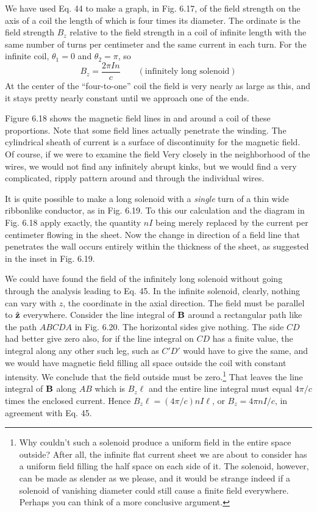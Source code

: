 We have used Eq. 44 to make a graph, in Fig. 6.17, of the field
strength on the axis of a coil the length of which is four times its
diameter. The ordinate is the field strength $B_z$ relative to the field
strength in a coil of infinite length with the same number of turns
per centimeter and the same current in each turn. For the infinite
coil, $\theta_1 = 0$ and $\theta_2 = \pi$, so
\begin{equation}
  B_z = \frac{2\pi I n}{c} \qquad (\text{infinitely long solenoid})
\end{equation}
At the center of the ``four-to-one'' coil the field is very nearly as large
as this, and it stays pretty nearly constant until we approach one of
the ends.

Figure 6.18 shows the magnetic field lines in and around a coil of
these proportions. Note that some field lines actually penetrate the
winding. The cylindrical sheath of current is a surface of discontinuity
for the magnetic field. Of course, if we were to examine the
field Very closely in the neighborhood of the wires, we would not find
any infinitely abrupt kinks, but we would find a very complicated,
ripply pattern around and through the individual wires.

It is quite possible to make a long solenoid with a \emph{single} turn of a
thin wide ribbonlike conductor, as in Fig. 6.19. To this our calculation
and the diagram in Fig. 6.18 apply exactly, the quantity $nI$ being
merely replaced by the current per centimeter flowing in the sheet.
Now the change in direction of a field line that penetrates the wall
occurs entirely within the thickness of the sheet, as suggested in the
inset in Fig. 6.19.

We could have found the field of the infinitely long solenoid without
going through the analysis leading to Eq. 45. In the infinite
solenoid, clearly, nothing can vary with $z$, the coordinate in the axial
direction. The field must be parallel to $\hat{\mathbf{z}}$ everywhere. Consider the
line integral of $\mathbf{B}$ around a rectangular path like the path $ABCDA$ in
Fig. 6.20. The horizontal sides give nothing. The side $CD$ had better
give zero also, for if the line integral on $CD$ has a finite value, the
integral along any other such leg, such as $C'D'$ would have to give
the same, and we would have magnetic field filling all space outside
the coil with constant intensity. We conclude that the field outside
must be zero.\footnote{Why couldn't such a solenoid produce a uniform field in the entire space outside?
After all, the infinite flat current sheet we are about to consider has a uniform field
filling the half space on each side of it. The solenoid, however, can be made as slender
as we please, and it would be strange indeed if a solenoid of vanishing diameter could
still cause a finite field everywhere. Perhaps you can think of a more conclusive
argument.} That leaves the line integral of $\mathbf{B}$ along $AB$ which is
$B_z\ell$ and the entire line integral must equal $4\pi/c$ times the enclosed
current. Hence $B_z\ell = (4\pi/c)nI\ell$, or $B_z=4\pi nI/c$, in agreement
with Eq. 45.

